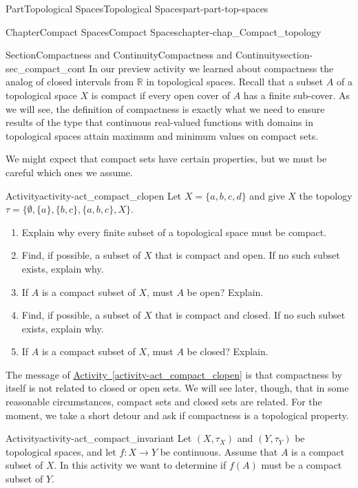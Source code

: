 \documentclass[oneside,10pt,]{book}
\newcommand{\xreffont}{\relax}
\numberwithin{equation}{chapter}
\newcommand{\R}{\mathbb{R}}
\begin{document}
\begin{partptx}{Part}{Topological Spaces}{}{Topological Spaces}{}{}{part-part-top-spaces}
\begin{chapterptx}{Chapter}{Compact Spaces}{}{Compact Spaces}{}{}{chapter-chap_Compact_topology}
\typeout{************************************************}
%
\begin{sectionptx}{Section}{Compactness and Continuity}{}{Compactness and Continuity}{}{}{section-sec_compact_cont}
In our preview activity we learned about compactness \textemdash{} the analog of closed intervals from \(\R\) in topological spaces. Recall that a subset \(A\) of a topological space \(X\) is compact if every open cover of \(A\) has a finite sub-cover. As we will see, the definition of compactness is exactly what we need to ensure results of the type that continuous real-valued functions with domains in topological spaces attain maximum and minimum values on compact sets.%
\par
We might expect that compact sets have certain properties, but we must be careful which ones we assume.%
\begin{activity}{Activity}{}{activity-act_compact_clopen}%
Let \(X = \{a,b,c,d\}\) and give \(X\) the topology \(\tau = \{\emptyset, \{a\}, \{b,c\}, \{a,b,c\}, X\}\).%
\begin{enumerate}[font=\bfseries,label=(\alph*),ref=\alph*]%
\item{}Explain why every finite subset of a topological space must be compact.%
\item{}Find, if possible, a subset of \(X\) that is compact and open. If no such subset exists, explain why.%
\item{}If \(A\) is a compact subset of \(X\), must \(A\) be open? Explain.%
\item{}Find, if possible, a subset of \(X\) that is compact and closed. If no such subset exists, explain why.%
\item{}If \(A\) is a compact subset of \(X\), must \(A\) be closed? Explain.%
\end{enumerate}%
\end{activity}%
The message of \hyperref[activity-act_compact_clopen]{Activity~{\xreffont\ref{activity-act_compact_clopen}}} is that compactness by itself is not related to closed or open sets. We will see later, though, that in some reasonable circumstances, compact sets and closed sets are related. For the moment, we take a short detour and ask if compactness is a topological property.%
\begin{activity}{Activity}{}{activity-act_compact_invariant}%
Let \((X, \tau_X)\) and \((Y, \tau_Y)\) be topological spaces, and let \(f: X \to Y\) be continuous. Assume that \(A\) is a compact subset of \(X\). In this activity we want to determine if \(f(A)\) must be a compact subset of \(Y\).%

\end{activity}
\end{sectionptx}
\end{chapterptx}
\end{partptx}
\end{document}
